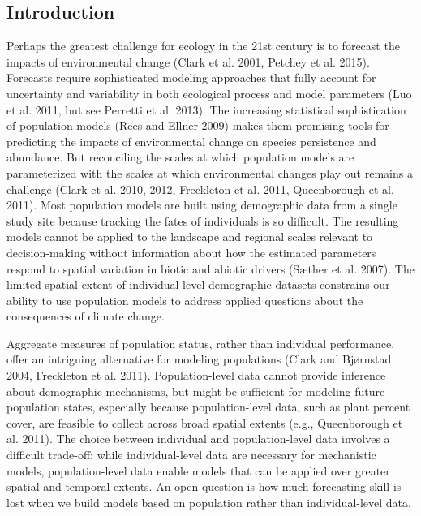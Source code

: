 \documentclass[12pt,]{article}
\begin{document}
\subsection{Introduction}\label{introduction}

Perhaps the greatest challenge for ecology in the 21st century is to
forecast the impacts of environmental change (Clark et al. 2001, Petchey
et al. 2015). Forecasts require sophisticated modeling approaches that
fully account for uncertainty and variability in both ecological process
and model parameters (Luo et al. 2011, but see Perretti et al. 2013).
The increasing statistical sophistication of population models (Rees and
Ellner 2009) makes them promising tools for predicting the impacts of
environmental change on species persistence and abundance. But
reconciling the scales at which population models are parameterized with
the scales at which environmental changes play out remains a challenge
(Clark et al. 2010, 2012, Freckleton et al. 2011, Queenborough et al.
2011). Most population models are built using demographic data from a
single study site because tracking the fates of individuals is so
difficult. The resulting models cannot be applied to the landscape and
regional scales relevant to decision-making without information about
how the estimated parameters respond to spatial variation in biotic and
abiotic drivers (Sæther et al. 2007). The limited spatial extent of
individual-level demographic datasets constrains our ability to use
population models to address applied questions about the consequences of
climate change.

Aggregate measures of population status, rather than individual
performance, offer an intriguing alternative for modeling populations
(Clark and Bjørnstad 2004, Freckleton et al. 2011). Population-level
data cannot provide inference about demographic mechanisms, but might be
sufficient for modeling future population states, especially because
population-level data, such as plant percent cover, are feasible to
collect across broad spatial extents (e.g., Queenborough et al. 2011).
The choice between individual and population-level data involves a
difficult trade-off: while individual-level data are necessary for
mechanistic models, population-level data enable models that can be
applied over greater spatial and temporal extents. An open question is
how much forecasting skill is lost when we build models based on
population rather than individual-level data.
\end{document}
